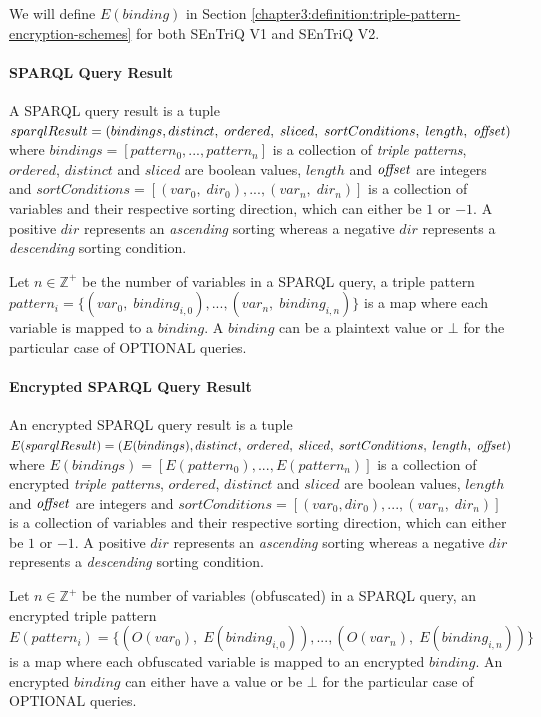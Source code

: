 We will define $E(binding)$ in Section \ref{chapter3:definition:triple-pattern-encryption-schemes} for both \gls{SEnTriQ} V1 and \gls{SEnTriQ} V2.


\paragraph{SPARQL Query Result} A \gls{SPARQL} query result is a tuple $sparqlResult = (bindings, \allowbreak distinct, \; ordered, \; sliced, \; sortConditions, \; length, \; \textrm{\textit{offset}})$ where $bindings = [pattern_0, ..., \allowbreak pattern_n]$ is a collection of \emph{triple patterns}, $ordered$, $distinct$ and $sliced$ are boolean values, $length$ and $\textrm{\textit{offset}}$ are integers and $sortConditions = [(var_0, \; dir_0), ..., (var_n, \; dir_n)]$ is a collection of variables and their respective sorting direction, which can either be $1$ or $-1$. A positive $dir$ represents an \emph{ascending} sorting whereas a negative $dir$ represents a \emph{descending} sorting condition.

Let $n \in \mathbb{Z}^{+}$ be the number of variables in a \gls{SPARQL} query, a triple pattern $pattern_i = \{(var_0, \; binding_{i,0}),...,(var_n, \; binding_{i,n})\}$ is a map where each variable is mapped to a $binding$. A $binding$ can be a plaintext value or $\bot$ for the particular case of $\textrm{OPTIONAL}$ queries.

\paragraph{Encrypted SPARQL Query Result} An encrypted \gls{SPARQL} query result is a tuple \linebreak $E(sparqlResult) = (E(bindings), \allowbreak distinct, \; ordered, \; sliced, \; sortConditions, \; length, \; \textrm{\textit{offset}})$ where $E(bindings) = [E(pattern_0), ..., \allowbreak E(pattern_n)]$ is a collection of encrypted \emph{triple patterns}, $ordered$, $distinct$ and $sliced$ are boolean values, $length$ and $\textrm{\textit{offset}}$ are integers and $sortConditions = [(var_0, \allowbreak dir_0), ..., (var_n, \; dir_n)]$ is a collection of variables and their respective sorting direction, which can either be $1$ or $-1$. A positive $dir$ represents an \emph{ascending} sorting whereas a negative $dir$ represents a \emph{descending} sorting condition.

Let $n \in \mathbb{Z}^{+}$ be the number of variables (obfuscated) in a \gls{SPARQL} query, an encrypted triple pattern $E(pattern_i) = \{(O(var_0), \; E(binding_{i,0})),...,(O(var_n), \; E(binding_{i,n}))\}$ is a map where each obfuscated variable is mapped to an encrypted $binding$. An encrypted $binding$ can either have a value or be $\bot$ for the particular case of $\textrm{OPTIONAL}$ queries.

